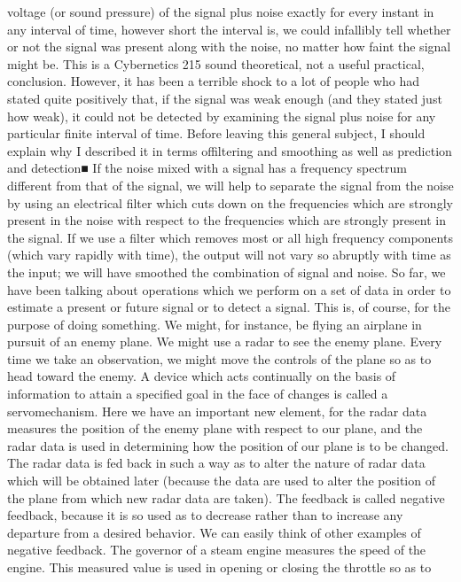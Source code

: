 {{{{{{{{{{{voltage (or sound pressure) of the signal plus noise exactly for
every instant in any interval of time, however short the interval is,
we could infallibly tell whether or not the signal was present along
with the noise, no matter how faint the signal might be. This is a
Cybernetics 215
sound theoretical, not a useful practical, conclusion. However, it
has been a terrible shock to a lot of people who had stated quite
positively that, if the signal was weak enough (and they stated just
how weak), it could not be detected by examining the signal plus
noise for any particular finite interval of time.
Before leaving this general subject, I should explain why I
described it in terms offiltering and smoothing as well as prediction
and detection■ If the noise mixed with a signal has a frequency
spectrum different from that of the signal, we will help to separate
the signal from the noise by using an electrical filter which cuts
down on the frequencies which are strongly present in the noise
with respect to the frequencies which are strongly present in the
signal. If we use a filter which removes most or all high frequency
components (which vary rapidly with time), the output will not
vary so abruptly with time as the input; we will have smoothed the
combination of signal and noise.
So far, we have been talking about operations which we perform
on a set of data in order to estimate a present or future signal or
to detect a signal. This is, of course, for the purpose of doing
something.
We might, for instance, be flying an airplane in pursuit of an
enemy plane. We might use a radar to see the enemy plane. Every
time we take an observation, we might move the controls of the
plane so as to head toward the enemy.
A device which acts continually on the basis of information to
attain a specified goal in the face of changes is called a servomechanism.
Here we have an important new element, for the radar
data measures the position of the enemy plane with respect to our
plane, and the radar data is used in determining how the position
of our plane is to be changed. The radar data is fed back in such
a way as to alter the nature of radar data which will be obtained
later (because the data are used to alter the position of the plane
from which new radar data are taken). The feedback is called
negative feedback, because it is so used as to decrease rather than
to increase any departure from a desired behavior.
We can easily think of other examples of negative feedback. The
governor of a steam engine measures the speed of the engine. This
measured value is used in opening or closing the throttle so as to
}}}}}}}}}}}
